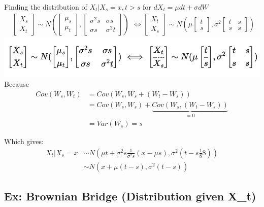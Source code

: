 \documentclass[
  oneside]{book}
\begin{document}
Finding the distribution of \(X_{t}|X_{s} = x, t>s\) for \(dX_{t} = \mu dt+\sigma dW\)
\[
\begin{aligned}
\left[ \begin{array}{c}
X_{s} \\
X_{t}
\end{array} \right] \sim N(
\left[ \begin{array}{c}
\mu_{s} \\
\mu_{t}
\end{array} \right],
\left[ \begin{array}{cc}
\sigma^{2}s & \sigma s \\
\sigma s & \sigma^{2}t
\end{array} \right] )
\end{aligned} \iff \left[ \begin{array}{c}
X_{t}  \\
X_{s}
\end{array}  \right] \sim N(\mu \left[ \begin{array}{c}
t \\
\hline s
\end{array} \right],
\sigma^{2} \left[ \begin{array}{cc}
t & s \\
s & s
\end{array} \right] )
\]
\includegraphics{Notes/Obsidian-Attachments/10-Simulation-4.png}
Because
\[
\begin{aligned}
Cov(W_{s},W_{t}) &= Cov(W_{s}, W_{s}+(W_{t}-W_{s}))\\
&= Cov(W_{s}, W_{s}) + \underbrace{ Cov(W_{s}, (W_{t}-W_{s})) }_{ =0 }\\
&= Var(W_{s}) = s
\end{aligned}
\]

Which gives:
\[
\begin{aligned}
X_{t} | X_{s} = x &\sim N\left( \mu t + \sigma^{2}s \frac{1}{\sigma^{2}s} (x-\mu s), \sigma^{2}\left( t-s \frac{1}{8}8 \right) \right)\\
&\sim N(x + \mu (t-s), \sigma^{2}(t-s))
\end{aligned}
\]

\hypertarget{ex-brownian-bridge-distribution-given-x_t}{%
\subsection{Ex: Brownian Bridge (Distribution given X\_t)}\label{ex-brownian-bridge-distribution-given-x_t}}
\end{document}
